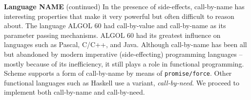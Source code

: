 \begin{minipage}[t]{\sw}
\slidenumber
\LARGE
{\bf Language NAME} (continued)\exx
In the presence of side-effects, call-by-name has interesting
properties that make it very powerful
but often difficult to reason about.
The language ALGOL 60 had call-by-value and call-by-name
as its parameter passing mechanisms.
ALGOL 60 had its greatest influence on languages
such as Pascal, C/C++, and Java.
Although call-by-name has been all but abandoned
by modern imperative (side-effecting) programming languages --
mostly because of its inefficiency,
it still plays a role in functional programming.
Scheme supports a form of call-by-name
by means of \verb'promise/force'.
Other functional languages such as Haskell use a variant, {\em call-by-need}.
We proceed to implement both call-by-name and call-by-need.
\end{minipage}
